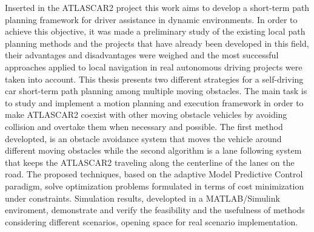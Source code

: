 Inserted in the ATLASCAR2 project this work aims to develop a short-term path planning framework for driver assistance in dynamic environments. In order to achieve this objective, it was made a preliminary study of the existing local path planning methods and the projects that have already been developed in this field, their advantages and disadvantages were weighed and the most successful approaches applied to local navigation in real autonomous driving projects were taken into account.
This thesis presents two different strategies for a self-driving car short-term path planning among multiple moving obstacles. The main task is to study and implement a motion planning and execution framework in order to make ATLASCAR2 coexist with other moving obstacle vehicles by avoiding collision and overtake them when necessary and possible. The first method developted, is an obstacle avoidance system that moves the vehicle around different moving obstacles while the second algorithm is a lane following system that keeps the ATLASCAR2 traveling along the centerline of the lanes on the road. The proposed techniques, based on the adaptive Model Predictive Control paradigm, solve optimization problems formulated in terms of cost minimization under constraints. Simulation results, developted in a MATLAB/Simulink enviroment, demonstrate and verify the feasibility and the usefulness of methods considering different scenarios, opening space for real scenario implementation.
